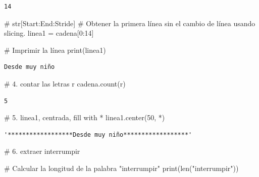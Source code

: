 \documentclass[
  spanish,
  letterpaper,
]{scrbook}
\newenvironment{Shaded}{\begin{snugshade}}{\end{snugshade}}
\newcommand{\BuiltInTok}[1]{\textcolor[rgb]{0.00,0.23,0.31}{#1}}
\newcommand{\CommentTok}[1]{\textcolor[rgb]{0.37,0.37,0.37}{#1}}
\newcommand{\DecValTok}[1]{\textcolor[rgb]{0.68,0.00,0.00}{#1}}
\newcommand{\NormalTok}[1]{\textcolor[rgb]{0.00,0.23,0.31}{#1}}
\newcommand{\OperatorTok}[1]{\textcolor[rgb]{0.37,0.37,0.37}{#1}}
\newcommand{\StringTok}[1]{\textcolor[rgb]{0.13,0.47,0.30}{#1}}
\theoremstyle{definition}
\theoremstyle{remark}
\begin{document}
\begin{verbatim}
14
\end{verbatim}

\begin{Shaded}
\begin{Highlighting}[]
\CommentTok{\# str[Start:End:Stride]}
\CommentTok{\# Obtener la primera línea sin el cambio de línea usando slicing.}
\NormalTok{linea1 }\OperatorTok{=}\NormalTok{ cadena[}\DecValTok{0}\NormalTok{:}\DecValTok{14}\NormalTok{]}

\CommentTok{\# Imprimir la línea}
\BuiltInTok{print}\NormalTok{(linea1)}
\end{Highlighting}
\end{Shaded}

\begin{verbatim}
Desde muy niño
\end{verbatim}

\begin{Shaded}
\begin{Highlighting}[]
\CommentTok{\# 4. contar las letras \textquotesingle{}r\textquotesingle{}}
\NormalTok{cadena.count(}\StringTok{\textquotesingle{}r\textquotesingle{}}\NormalTok{)}
\end{Highlighting}
\end{Shaded}

\begin{verbatim}
5
\end{verbatim}

\begin{Shaded}
\begin{Highlighting}[]
\CommentTok{\# 5. linea1, centrada, fill with *}
\NormalTok{linea1.center(}\DecValTok{50}\NormalTok{, }\StringTok{\textquotesingle{}*\textquotesingle{}}\NormalTok{)}
\end{Highlighting}
\end{Shaded}

\begin{verbatim}
'******************Desde muy niño******************'
\end{verbatim}

\begin{Shaded}
\begin{Highlighting}[]
\CommentTok{\# 6. extraer \textquotesingle{}interrumpir\textquotesingle{}}

\CommentTok{\# Calcular la longitud de la palabra "interrumpir"}
\BuiltInTok{print}\NormalTok{(}\BuiltInTok{len}\NormalTok{(}\StringTok{"interrumpir"}\NormalTok{))}
\end{Highlighting}
\end{Shaded}
\end{document}
